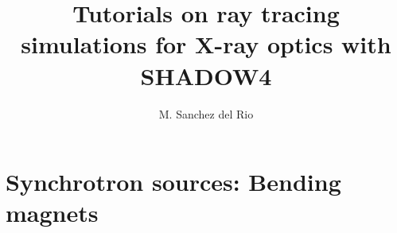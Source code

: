\documentclass{ol-softwaremanual}
\title{Tutorials on ray tracing simulations for X-ray optics with SHADOW4}
\author{M. Sanchez del Rio}
\begin{document}
\maketitle

\tableofcontents


\newpage
\section{Synchrotron sources: Bending magnets}


\end{document}
